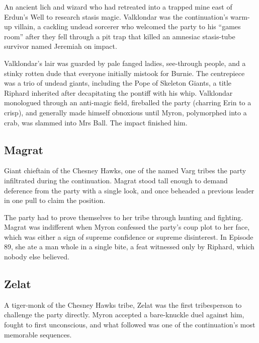 \noindent

An ancient lich and wizard who had retreated into a trapped mine east of Erdun's Well to research stasis magic.  Valklondar was the continuation's warm-up villain, a cackling undead sorcerer who welcomed the party to his ``games room'' after they fell through a pit trap that killed an amnesiac stasis-tube survivor named Jeremiah on impact.

Valklondar's lair was guarded by pale fanged ladies, see-through people, and a stinky rotten dude that everyone initially mistook for Burnie.  The centrepiece was a trio of undead giants, including the Pope of Skeleton Giants, a title Riphard inherited after decapitating the pontiff with his whip.  Valklondar monologued through an anti-magic field, fireballed the party (charring Erin to a crisp), and generally made himself obnoxious until Myron, polymorphed into a crab, was slammed into Mrs Ball.  The impact finished him.

\smallskip

\subsection*{Magrat}

\noindent

Giant chieftain of the Chesney Hawks, one of the named Varg tribes the party infiltrated during the continuation.  Magrat stood tall enough to demand deference from the party with a single look, and once beheaded a previous leader in one pull to claim the position.

The party had to prove themselves to her tribe through hunting and fighting.  Magrat was indifferent when Myron confessed the party's coup plot to her face, which was either a sign of supreme confidence or supreme disinterest.  In Episode 89, she ate a man whole in a single bite, a feat witnessed only by Riphard, which nobody else believed.

\smallskip

\subsection*{Zelat}

\noindent

A tiger-monk of the Chesney Hawks tribe, Zelat was the first tribesperson to challenge the party directly.  Myron accepted a bare-knuckle duel against him, fought to first unconscious, and what followed was one of the continuation's most memorable sequences.

